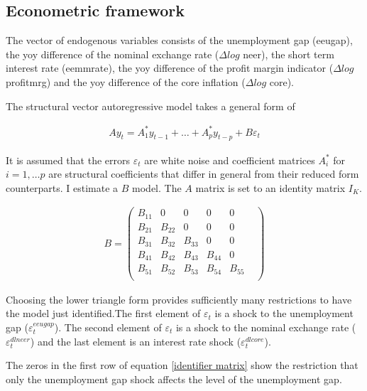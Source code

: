 \documentclass[twoside]{article}
\begin{document}
\begin{multicols}{2}
\section{Econometric framework}
\label{Econometric framework}

The vector of endogenous variables  consists of the unemployment gap (eeugap), the yoy difference of the nominal exchange rate ($\Delta log $ neer), the short term interest rate (eemmrate), the yoy difference of the profit margin indicator ($\Delta log$ profitmrg) and the yoy difference of the core inflation ($\Delta log$ core). 

The structural vector autoregressive model takes a general form of 

\begin{multline}
Ay_{t}= A^*_{1}y_{t-1} + \dots + A^*_{p}y_{t-p}+ B\varepsilon_{t} 
\end{multline}

It is assumed that the errors $\varepsilon_{t}$ are white noise and coefficient matrices $A^*_{i}$ for $i = 1,\dots p$ are structural coefficients that differ in general from their reduced form counterparts. I estimate a $B$ model. The $A$ matrix is set to  an identity matrix $I_{K}$. 

\begin{align}\label{identifier matrix}
B=
  \begin{pmatrix}
   B_{11} & 0      & 0      & 0      & 0\\
   B_{21} & B_{22} & 0      & 0      & 0      & \\
   B_{31} & B_{32} & B_{33} & 0      & 0      & \\
   B_{41} & B_{42} & B_{43} & B_{44} & 0      & \\
   B_{51} & B_{52} & B_{53} & B_{54} & B_{55} & \\
  \end{pmatrix}
\end{align}


Choosing the lower triangle form provides sufficiently many restrictions to have the model just identified.The first element of $\varepsilon_{t}$ is a shock to the unemployment gap ($\varepsilon^{eeugap}_{t}$). The second element of $\varepsilon_{t}$ is a shock to the nominal exchange rate ($\varepsilon^{dlneer}_{t}$) and the last element is an interest rate shock ($\varepsilon^{dlcore}_{t}$). 

The zeros in the first row of equation \eqref{identifier matrix} show the restriction that only the unemployment gap shock affects the level of the unemployment gap. 


\end{multicols}
\end{document}
